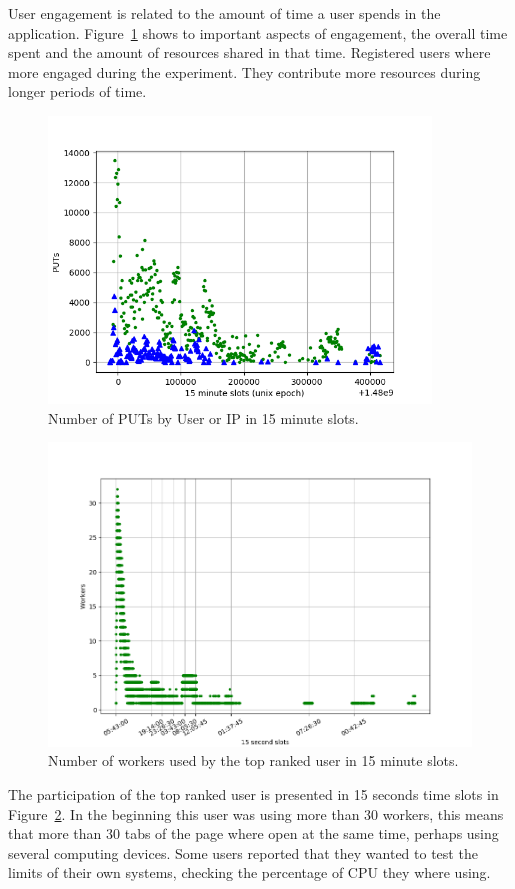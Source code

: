\documentclass{llncs}
\begin{document}
User engagement is related to the amount of time a user spends in the 
application. Figure~\ref{fig:puts-time} shows to important aspects of
engagement, the overall time spent and the amount of resources shared
in that time. Registered users where more engaged during the experiment.
They contribute more resources during longer periods of time.

%
\begin{figure}[htbp]
    \centering
        \includegraphics[width=4in]{img/puts_by_time.png}
    \caption{Number of PUTs by User or IP in 15 minute slots.
    }
    \label{fig:puts-time}
\end{figure}
%
\begin{figure}[htbp]
    \centering
        \includegraphics[width=5in]{img/workers_best_user.png}
    \caption{ Number of workers used by the top ranked user in 15 minute slots.
    }
    \label{fig:top-user}
\end{figure}
%
The participation of the top ranked user is presented in 15 seconds time slots in
Figure~\ref{fig:top-user}. In the beginning this user was using more than 30
workers, this means that more than 30 tabs of the page where open at the
same time, perhaps using several computing devices. Some users reported that 
they wanted to test the limits of their own systems, checking the percentage of
CPU they where using. 
\end{document}
